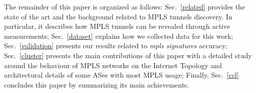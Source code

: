 The remainder of this paper is organized as follows: Sec.~\ref{related} provides
the state of the art and the background related to MPLS tunnels discovery. In
particular, it describes how MPLS tunnels can be revealed through active
measurements;  Sec.~\ref{dataset} explains how we collected data for this work;
Sec.~\ref{validation} presents our results related to \textit{mpls signatures}
accuracy; Sec.~\ref{cluster} presents the main contributions of this paper with
a detailed study around the behaviour of MPLS networks on the Internet Topology
and architectural details of some ASes with most MPLS usage; Finally,
Sec.~\ref{ccl} concludes this paper by summarizing its main achievements.

